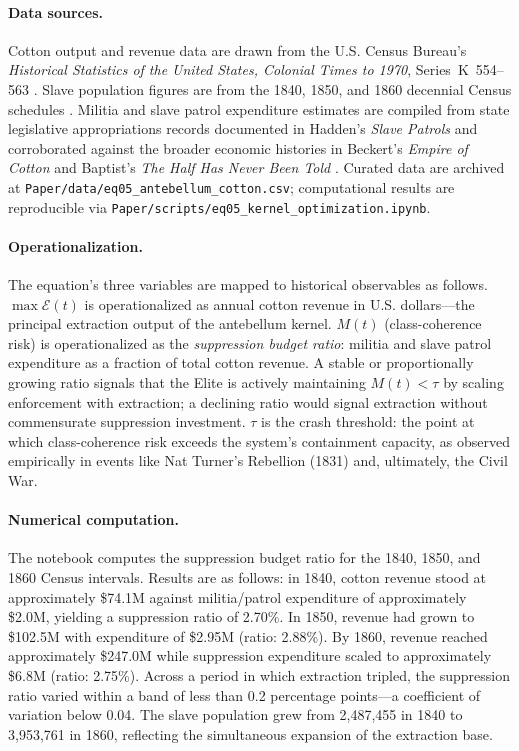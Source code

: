 \paragraph{Data sources.}
Cotton output and revenue data are drawn from the U.S. Census Bureau's \textit{Historical Statistics of the United States, Colonial Times to 1970}, Series~K~554--563 \cite{census_hist_stats}. Slave population figures are from the 1840, 1850, and 1860 decennial Census schedules \cite{census_1860}. Militia and slave patrol expenditure estimates are compiled from state legislative appropriations records documented in Hadden's \textit{Slave Patrols} \cite{hadden_slave_patrols} and corroborated against the broader economic histories in Beckert's \textit{Empire of Cotton} \cite{beckert} and Baptist's \textit{The Half Has Never Been Told} \cite{baptist}. Curated data are archived at \texttt{Paper/data/eq05\_antebellum\_cotton.csv}; computational results are reproducible via \texttt{Paper/scripts/eq05\_kernel\_optimization.ipynb}.

\paragraph{Operationalization.}
The equation's three variables are mapped to historical observables as follows. $\max \mathcal{E}(t)$ is operationalized as annual cotton revenue in U.S. dollars---the principal extraction output of the antebellum kernel. $M(t)$ (class-coherence risk) is operationalized as the \textit{suppression budget ratio}: militia and slave patrol expenditure as a fraction of total cotton revenue. A stable or proportionally growing ratio signals that the Elite is actively maintaining $M(t) < \tau$ by scaling enforcement with extraction; a declining ratio would signal extraction without commensurate suppression investment. $\tau$ is the crash threshold: the point at which class-coherence risk exceeds the system's containment capacity, as observed empirically in events like Nat Turner's Rebellion (1831) and, ultimately, the Civil War.

\paragraph{Numerical computation.}
The notebook computes the suppression budget ratio for the 1840, 1850, and 1860 Census intervals. Results are as follows: in 1840, cotton revenue stood at approximately \$74.1M against militia/patrol expenditure of approximately \$2.0M, yielding a suppression ratio of 2.70\%. In 1850, revenue had grown to \$102.5M with expenditure of \$2.95M (ratio: 2.88\%). By 1860, revenue reached approximately \$247.0M while suppression expenditure scaled to approximately \$6.8M (ratio: 2.75\%). Across a period in which extraction tripled, the suppression ratio varied within a band of less than 0.2 percentage points---a coefficient of variation below 0.04. The slave population grew from 2,487,455 in 1840 to 3,953,761 in 1860, reflecting the simultaneous expansion of the extraction base.

